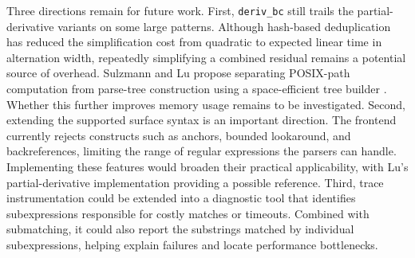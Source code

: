 Three directions remain for future work.
First, \texttt{deriv\_bc} still trails the
partial-derivative variants on some large patterns.
Although hash-based deduplication has reduced
the simplification cost from quadratic to
expected linear time in alternation width,
repeatedly simplifying a combined residual
remains a potential source of overhead.
Sulzmann and Lu propose separating POSIX-path
computation from parse-tree construction using
a space-efficient tree builder
\citep[p.~14]{sulzmannlu2014}.
Whether this further improves memory usage
remains to be investigated.
Second, extending the supported surface syntax
is an important direction.
The frontend currently rejects constructs
such as anchors, bounded lookaround, and
backreferences, limiting the range of regular
expressions the parsers can handle.
Implementing these features would broaden
their practical applicability, with
Lu's partial-derivative implementation
\citep{lu_regex_pderiv} providing a
possible reference.
Third, trace instrumentation could be extended
into a diagnostic tool that identifies
subexpressions responsible for costly matches
or timeouts.
Combined with submatching, it could also
report the substrings matched by individual
subexpressions, helping explain failures
and locate performance bottlenecks.

